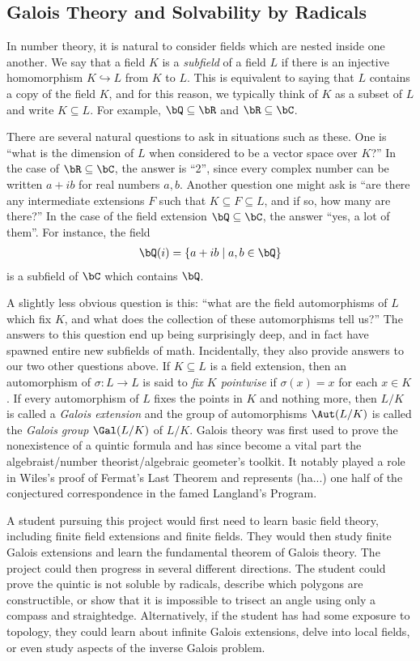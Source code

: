 \subsection{Galois Theory and Solvability by Radicals}
In number theory, it is natural to consider fields which are nested inside one another. We say that a field $K$ is a \emph{subfield} of a field $L$ if there is an injective homomorphism $K\hookrightarrow L$ from $K$ to $L$. This is equivalent to saying that $L$ contains a copy of the field $K$, and for this reason, we typically think of $K$ as a subset of $L$ and write $K \subseteq L$. For example, $\bQ \subseteq \bR$ and $\bR \subseteq \bC$.

There are several natural questions to ask in situations such as these. One is ``what is the dimension of $L$ when considered to be a vector space over $K$?'' In the case of $\bR \subseteq \bC$, the answer is ``2'', since every complex number can be written $a + ib$ for real numbers $a,b$. Another question one might ask is ``are there any intermediate extensions $F$ such that $K \subseteq F\subseteq L$, and if so, how many are there?'' In the case of the field extension $\bQ \subseteq \bC$, the answer ``yes, a lot of them''. For instance, the field
\begin{align*}
	\bQ(i) = \{a + ib \mid a,b \in \bQ\}
\end{align*}
is a subfield of $\bC$ which contains $\bQ$.

A slightly less obvious question is this: ``what are the field automorphisms of $L$ which fix $K$, and what does the collection of these automorphisms tell us?'' The answers to this question end up being surprisingly deep, and in fact have spawned entire new subfields of math. Incidentally, they also provide answers to our two other questions above. If $K\subseteq L$ is a field extension, then an automorphism of $\sigma:L \to L$ is said to \emph{fix $K$ pointwise} if $\sigma(x) = x$ for each $x \in K$. If every automorphism of $L$ fixes the points in $K$ and nothing more, then $L/K$ is called a \emph{Galois extension} and the group of automorphisms $\Aut(L/K)$ is called the \emph{Galois group} $\Gal(L/K)$ of $L/K$. Galois theory was first used to prove the nonexistence of a quintic formula and has since become a vital part the algebraist/number theorist/algebraic geometer's toolkit. It notably played a role in Wiles's proof of Fermat's Last Theorem and represents (ha...) one half of the conjectured correspondence in the famed Langland's Program.

A student pursuing this project would first need to learn basic field theory, including finite field extensions and finite fields. They would then study finite Galois extensions and learn the fundamental theorem of Galois theory. The project could then progress in several different directions. The student could prove the quintic is not soluble by radicals, describe which polygons are constructible, or show that it is impossible to trisect an angle using only a compass and straightedge. Alternatively, if the student has had some exposure to topology, they could learn about infinite Galois extensions, delve into local fields, or even study aspects of the inverse Galois problem.
